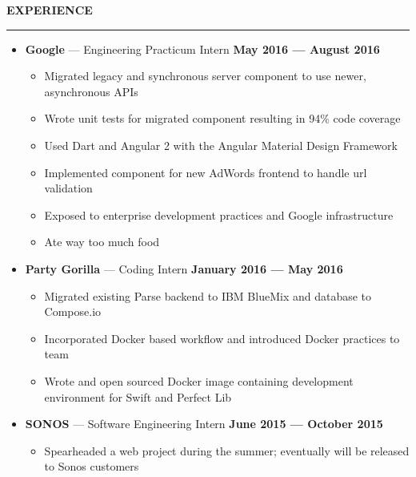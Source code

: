 \documentclass[10pt, oneside]{letter}
\newcommand{\linespaceshit} {
    \vspace{0.05in}
    \hrule
    \vspace{0.05in}
}
\begin{document}
    \textbf{EXPERIENCE}
    \linespaceshit{}
        \begin{adjustwidth}{0.1in}{0pt}

            \begin{itemize}
                \item
                    \textbf{Google} --- Engineering Practicum Intern \hfill  \textbf{May 2016 --- August 2016}
                        \begin{itemize}
                            \item Migrated legacy and synchronous server component to use newer, asynchronous APIs
                            \item Wrote unit tests for migrated component resulting in 94\% code coverage
                            \item Used Dart and Angular 2 with the Angular Material Design Framework
                            \item Implemented component for new AdWords frontend to handle url validation
                            \item Exposed to enterprise development practices and Google infrastructure
                            \item Ate way too much food
                        \end{itemize}
                \item
                    \textbf{Party Gorilla} --- Coding Intern \hfill \textbf{January 2016 --- May 2016}
                        \begin{itemize}
                            \item Migrated existing Parse backend to IBM BlueMix and database to Compose.io
                            \item Incorporated Docker based workflow and introduced Docker practices to team
                            \item Wrote and open sourced Docker image containing development environment for Swift and Perfect Lib
                        \end{itemize}
                \item
                    \textbf{SONOS} --- Software Engineering Intern \hfill \textbf{June 2015 --- October 2015}
                        \begin{itemize}
                            \item Spearheaded a web project during the summer; eventually will be released to Sonos customers

\end{itemize}
\end{itemize}
\end{adjustwidth}
\end{document}
